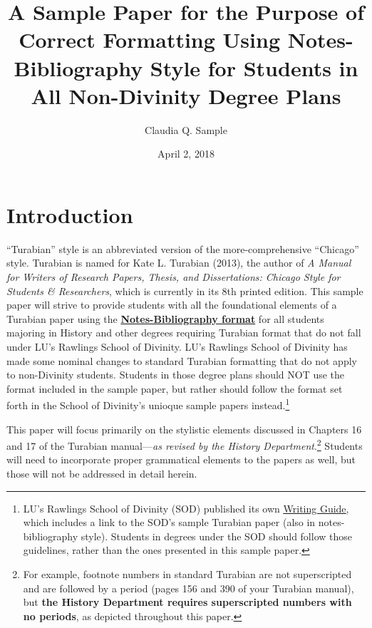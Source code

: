 \documentclass[raggedright]{turabian-researchpaper}
\title{A Sample Paper for the Purpose of Correct Formatting Using
  Notes-Bibliography Style for Students in All Non-Divinity Degree Plans}
\author{Claudia Q. Sample}
\date{April 2, 2018}
\newcommand*{\bluehref}[2]{\href{#1}{\color{blue}\underline{#2}}}
\begin{document}
\maketitle

\setcounter{page}{2}
\setcounter{tocdepth}{2}
\tableofcontents
\clearpage
{}

\section{Introduction}

``Turabian'' style is an abbreviated version of the more-comprehensive
``Chicago'' style. Turabian is named for Kate L. Turabian (2013), the author of
\textit{A Manual for Writers of Research Papers, Thesis, and Dissertations:
Chicago Style for Students \& Researchers}, which is currently in its 8th
printed edition.\autocite{Turabian} This sample paper will strive to provide
students with all the foundational elements of a Turabian paper using the
\textbf{\underline{Notes-Bibliography format}} for all students majoring in
History and other degrees requiring Turabian format that do not fall under LU's
Rawlings School of Divinity. LU's Rawlings School of Divinity has made some
nominal changes to standard Turabian formatting that do not apply to
non-Divinity students. Students in those degree plans should NOT use the format
included in the sample paper, but rather should follow the format set forth in
the School of Divinity's unioque sample papers instead.\footnote{LU's Rawlings
School of Divinity (SOD) published its own
\bluehref{http://www.liberty.edu/divinity/index.cfm?PID=28160}{Writing Guide},
which includes a link to the SOD's sample Turabian paper (also in
notes-bibliography style). Students in degrees under the SOD should follow those
guidelines, rather than the ones presented in this sample paper.}

This paper will focus primarily on the stylistic elements discussed in Chapters
16 and 17 of the Turabian manual\autocite[144-215]{Turabian}---\emph{as revised
by the History Department}.\footnote{For example, footnote numbers in standard
Turabian are not superscripted and are followed by a period (pages 156 and 390
of your Turabian manual), but \textbf{the History Department requires
superscripted numbers with no periods}, as depicted throughout this paper.}
Students will need to incorporate proper grammatical elements to the papers as
well, but those will not be addressed in detail herein.
\end{document}
